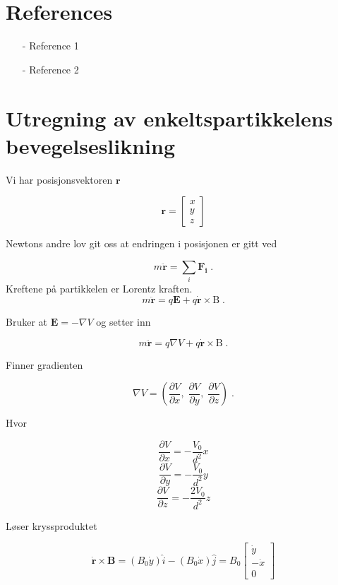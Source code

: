 \documentclass[reprint,english,notitlepage, nofootinbib]{revtex4-1}  %
\begin{document}
\section*{References}  %
\begin{itemize}
\item[-]Reference 1
\item[-]Reference 2
\end{itemize}

\newpage
\appendix
\section{Utregning av enkeltspartikkelens bevegelseslikning}
\label{moteq}
Vi har posisjonsvektoren $\mathbf{r}$

$$\mathbf{r} = \begin{bmatrix}
x \\ y \\ z 
\end{bmatrix}$$

Newtons andre lov git oss at endringen i posisjonen er gitt ved

$$m \ddot{\mathbf{r}} = \sum_i \mathbf{F_i} \; .$$
Kreftene på partikkelen er Lorentz kraften.
$$m \ddot{\mathbf{r}} = q \mathbf{E} + q \dot{\mathbf{r}} \times\mathrm{B} \; .$$

Bruker at $\mathbf{E} = -\nabla{V}$ og setter inn

$$m \ddot{\mathbf{r}} = q \nabla{V} + q \dot{\mathbf{r}} \times\mathrm{B} \; .$$

Finner gradienten

$$\nabla{V} = \left ( \frac{\partial V}{\partial x}, \; \frac{\partial V}{\partial y}, \; \frac{\partial V}{\partial z} \right ) \; .$$

Hvor

$$ \frac{\partial V}{\partial x} = -\frac{V_0}{d^2}x$$
$$ \frac{\partial V}{\partial y} = - \frac{V_0}{d^2}y$$
$$ \frac{\partial V}{\partial z} = - \frac{2V_0}{d^2}z$$

Løser kryssproduktet

$$\dot{\mathbf{r}} \times \mathbf{B} = (B_0 \dot{y})\hat{i} - (B_0\dot{x})\hat{j} = B_0 \begin{bmatrix}
\dot{y} \\ -\dot{x} \\ 0
\end{bmatrix}$$
\end{document}
